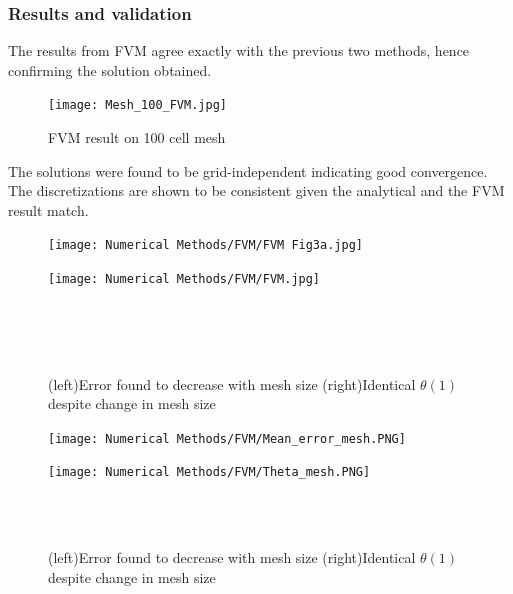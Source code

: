 \documentclass[12pt]{article}
\begin{document}
\subsubsection{Results and validation}
The results from FVM agree exactly with the previous two methods, hence confirming the solution obtained.
\begin{figure}[H]
    \centering
    \texttt{[image: Mesh\_100\_FVM.jpg]}
    \caption{FVM result on 100 cell mesh}
    \label{fig:31}
\end{figure}
The solutions were found to be grid-independent indicating good convergence. The discretizations are shown to be consistent given the analytical and the FVM result match.

\begin{figure}[H]
\begin{minipage}{.5\textwidth}
    \hspace{0.0cm}
    \vspace{-1.4cm}
  \texttt{[image: Numerical Methods/FVM/FVM Fig3a.jpg]}
  \label{fig:32}
\end{minipage}%
\begin{minipage}{.5\textwidth}
  \hspace{0.0cm}
  \vspace{-1.4cm}
  \texttt{[image: Numerical Methods/FVM/FVM.jpg]}
  \label{fig:33}
\end{minipage}
\\ \\ \\ 
\caption{(left)Error found to decrease with mesh size (right)Identical $\theta(1)$ despite change in mesh size}
\end{figure}

\begin{figure}[H]
\begin{minipage}{.5\textwidth}
    \hspace{-1.0cm}
    \vspace{-1.0cm}
  \texttt{[image: Numerical Methods/FVM/Mean\_error\_mesh.PNG]}
  \label{fig:34}
\end{minipage}%
\begin{minipage}{.5\textwidth}
  \hspace{0.0cm}
  \vspace{-1.4cm}
  \texttt{[image: Numerical Methods/FVM/Theta\_mesh.PNG]}
  \label{fig:35}
\end{minipage}
\\ \\
\caption{(left)Error found to decrease with mesh size (right)Identical $\theta(1)$ despite change in mesh size}
\end{figure}
\end{document}
